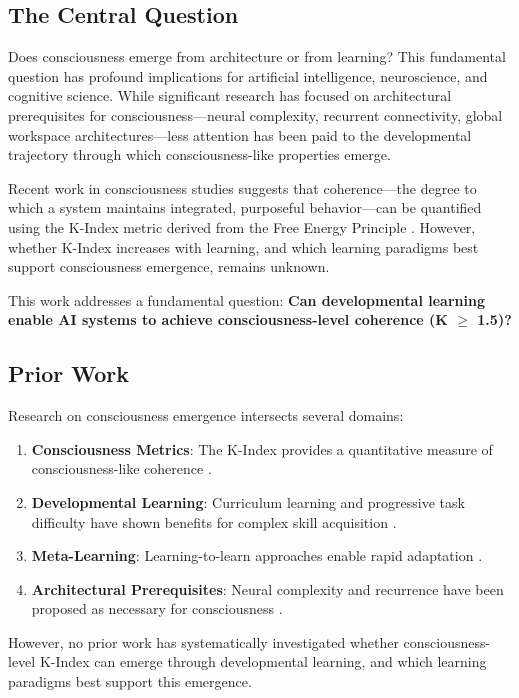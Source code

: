 \documentclass[10pt,letterpaper]{article}
\begin{document}
\subsection*{The Central Question}
Does consciousness emerge from architecture or from learning? This fundamental question has profound implications for artificial intelligence, neuroscience, and cognitive science. While significant research has focused on architectural prerequisites for consciousness—neural complexity, recurrent connectivity, global workspace architectures—less attention has been paid to the developmental trajectory through which consciousness-like properties emerge.

Recent work in consciousness studies suggests that coherence—the degree to which a system maintains integrated, purposeful behavior—can be quantified using the K-Index metric derived from the Free Energy Principle \cite{Friston2010}. However, whether K-Index increases with learning, and which learning paradigms best support consciousness emergence, remains unknown.

This work addresses a fundamental question: \textbf{Can developmental learning enable AI systems to achieve consciousness-level coherence (K $\geq$ 1.5)?}

\subsection*{Prior Work}
Research on consciousness emergence intersects several domains:

\begin{enumerate}
\item \textbf{Consciousness Metrics}: The K-Index provides a quantitative measure of consciousness-like coherence \cite{Friston2010,Ramstead2018}.
\item \textbf{Developmental Learning}: Curriculum learning and progressive task difficulty have shown benefits for complex skill acquisition \cite{Bengio2009}.
\item \textbf{Meta-Learning}: Learning-to-learn approaches enable rapid adaptation \cite{Finn2017}.
\item \textbf{Architectural Prerequisites}: Neural complexity and recurrence have been proposed as necessary for consciousness \cite{Tononi2016}.
\end{enumerate}

However, no prior work has systematically investigated whether consciousness-level K-Index can emerge through developmental learning, and which learning paradigms best support this emergence.
\end{document}
